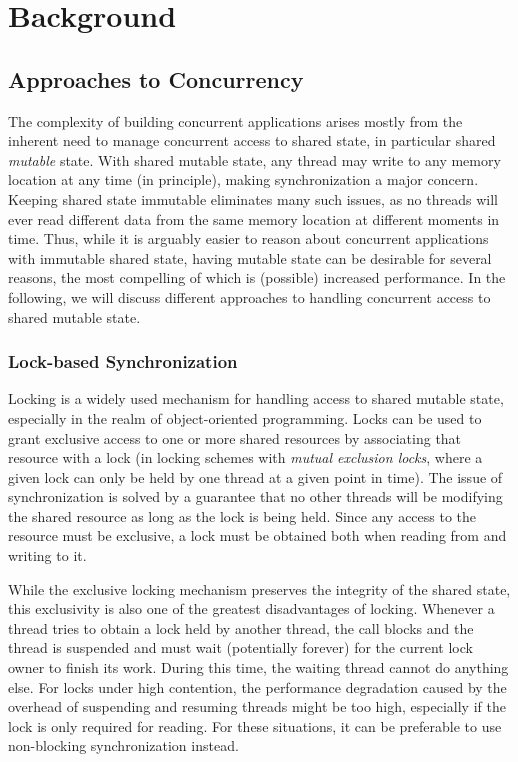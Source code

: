 \section{Background}
\label{sec:background}

\subsection{Approaches to Concurrency}
The complexity of building concurrent applications arises mostly from the inherent need to manage concurrent access to shared state, in particular shared \emph{mutable} state. With shared mutable state, any thread may write to any memory location at any time (in principle), making synchronization a major concern. Keeping shared state immutable eliminates many such issues, as no threads will ever read different data from the same memory location at different moments in time. Thus, while it is arguably easier to reason about concurrent applications with immutable shared state, having mutable state can be desirable for several reasons, the most compelling of which is (possible) increased performance. In the following, we will discuss different approaches to handling concurrent access to shared mutable state.

\subsubsection{Lock-based Synchronization}
Locking is a widely used mechanism for handling access to shared mutable state, especially in the realm of object-oriented programming. Locks can be used to grant exclusive access to one or more shared resources by associating that resource with a lock (in locking schemes with \emph{mutual exclusion locks}, where a given lock can only be held by one thread at a given point in time). The issue of synchronization is solved by a guarantee that no other threads will be modifying the shared resource as long as the lock is being held. Since any access to the resource must be exclusive, a lock must be obtained both when reading from and writing to it. 

While the exclusive locking mechanism preserves the integrity of the shared state, this exclusivity is also one of the greatest disadvantages of locking. Whenever a thread tries to obtain a lock held by another thread, the call blocks and the thread is suspended and must wait (potentially forever) for the current lock owner to finish its work. During this time, the waiting thread cannot do anything else. For locks under high contention, the performance degradation caused by the overhead of suspending and resuming threads might be too high, especially if the lock is only required for reading. For these situations, it can be preferable to use non-blocking synchronization instead.

